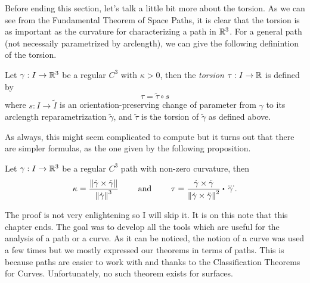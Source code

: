 Before ending this section, let's talk a little bit more about the torsion. As we can see from the Fundamental Theorem of Space Paths, it is clear that the torsion is as important as the curvature for characterizing a path in $\mathbb{R}^3$. For a general path (not necessaily parametrized by arclength), we can give the following definintion of the torsion.

\begin{definition}[Torsion]
    Let $\gamma : I \to \mathbb{R}^3$ be a regular $C^3$ with $\kappa > 0$, then the \textit{torsion} $\tau : I \to \mathbb{R}$ is defined by
    $$\tau = \tilde{\tau} \circ s$$
    where $s : I \to \tilde{I}$ is an orientation-preserving change of parameter from $\gamma$ to its arclength reparametrization $\tilde{\gamma}$, and $\tilde{\tau}$ is the torsion of $\tilde{\gamma}$ as defined above.
\end{definition}

As always, this might seem complicated to compute but it turns out that there are simpler formulas, as the one given by the following proposition.

\begin{proposition}
    Let $\gamma : I \to \mathbb{R}^3$ be a regular $C^3$ path with non-zero curvature, then
    $$\kappa = \frac{\norm{\dot{\gamma}\times \ddot{\gamma}}}{\norm{\dot{\gamma}}^3} \qquad \text{ and } \qquad \tau = \frac{\dot{\gamma}\times \ddot{\gamma}}{\norm{\dot{\gamma}\times \ddot{\gamma}}^2}\bigcdot \dddot{\gamma}.$$
\end{proposition}

The proof is not very enlightening so I will skip it. It is on this note that this chapter ends. The goal was to develop all the tools which are useful for the analysis of a path or a curve. As it can be noticed, the notion of a curve was used a few times but we mostly expressed our theorems in terms of paths. This is because paths are easier to work with and thanks to the Classification Theorems for Curves. Unfortunately, no such theorem exists for surfaces.

\newpage